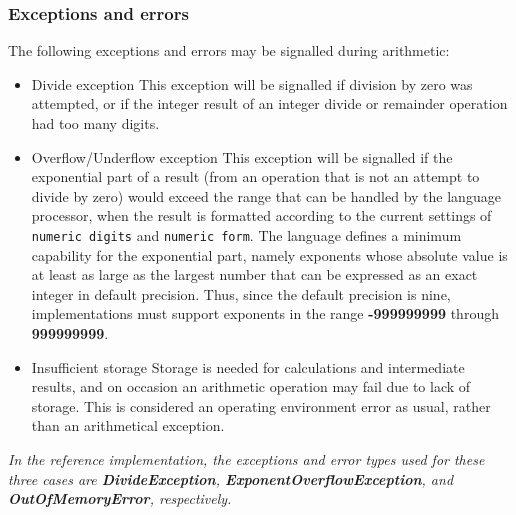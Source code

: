 \subsubsection{Exceptions and errors}
 The following exceptions and errors may be signalled during arithmetic:
\begin{itemize}
\item Divide exception
 This exception will be signalled if division by zero was attempted,
or if the integer result of an integer divide or remainder operation had
too many digits.
\item Overflow/Underflow exception
 This exception will be signalled if the exponential part of a result
(from an operation that is not an attempt to divide by zero) would
exceed the range that can be handled by the language processor, when the
result is formatted according to the current settings of \texttt{numeric
digits} and \texttt{numeric form}.
The language defines a minimum capability for the exponential part,
namely exponents whose absolute value is at least as large as the
largest number that can be expressed as an exact integer in default
precision.
Thus, since the default precision is nine, implementations must support
exponents in the range \textbf{-999999999}
through \textbf{999999999}.
\item Insufficient storage
 Storage is needed for calculations and intermediate results, and on
occasion an arithmetic operation may fail due to lack of storage.
This is considered an operating environment error as usual, rather
than an arithmetical exception.
\end{itemize}
 \emph{In the reference implementation, the exceptions and error types
used for these three cases
are \textbf{DivideException}, \textbf{ExponentOverflowException},
and \textbf{OutOfMemoryError}, respectively.}
\index{,}
\index{,}
\index{,}
